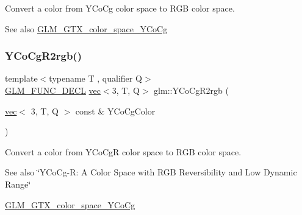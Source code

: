 Convert a color from Y\+Co\+Cg color space to R\+GB color space. \begin{DoxySeeAlso}{See also}
\mbox{\hyperlink{group__gtx__color__space___y_co_cg}{G\+L\+M\+\_\+\+G\+T\+X\+\_\+color\+\_\+space\+\_\+\+Y\+Co\+Cg}} 
\end{DoxySeeAlso}
\mbox{\label{group__gtx__color__space___y_co_cg_gaf8d30574c8576838097d8e20c295384a}} 
\subsubsection{\texorpdfstring{Y\+Co\+Cg\+R2rgb()}{YCoCgR2rgb()}}
{\footnotesize\ttfamily template$<$typename T , qualifier Q$>$ \\
\mbox{\hyperlink{setup_8hpp_ab2d052de21a70539923e9bcbf6e83a51}{G\+L\+M\+\_\+\+F\+U\+N\+C\+\_\+\+D\+E\+CL}} \mbox{\hyperlink{structglm_1_1vec}{vec}}$<$3, T, Q$>$ glm\+::\+Y\+Co\+Cg\+R2rgb (\begin{DoxyParamCaption}\item[{\mbox{\hyperlink{structglm_1_1vec}{vec}}$<$ 3, T, Q $>$ const \&}]{Y\+Co\+Cg\+Color }\end{DoxyParamCaption})}

Convert a color from Y\+Co\+CgR color space to R\+GB color space. \begin{DoxySeeAlso}{See also}
\char`\"{}\+Y\+Co\+Cg-\/\+R\+: A Color Space with R\+G\+B Reversibility and Low Dynamic Range\char`\"{} 

\mbox{\hyperlink{group__gtx__color__space___y_co_cg}{G\+L\+M\+\_\+\+G\+T\+X\+\_\+color\+\_\+space\+\_\+\+Y\+Co\+Cg}} 
\end{DoxySeeAlso}
